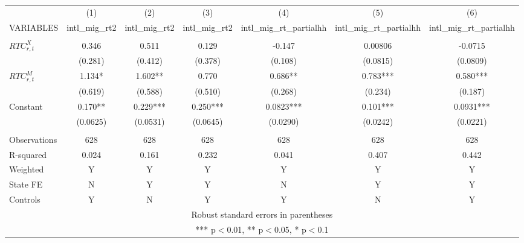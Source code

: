 \begin{tabular}{lcccccc} \hline
 & (1) & (2) & (3) & (4) & (5) & (6) \\
VARIABLES & intl\_mig\_rt2 & intl\_mig\_rt2 & intl\_mig\_rt2 & intl\_mig\_rt\_partialhh & intl\_mig\_rt\_partialhh & intl\_mig\_rt\_partialhh \\ \hline
 &  &  &  &  &  &  \\
$ RTC_{r,t}^X$ & 0.346 & 0.511 & 0.129 & -0.147 & 0.00806 & -0.0715 \\
 & (0.281) & (0.412) & (0.378) & (0.108) & (0.0815) & (0.0809) \\
$ RTC_{r,t}^M$ & 1.134* & 1.602** & 0.770 & 0.686** & 0.783*** & 0.580*** \\
 & (0.619) & (0.588) & (0.510) & (0.268) & (0.234) & (0.187) \\
Constant & 0.170** & 0.229*** & 0.250*** & 0.0823*** & 0.101*** & 0.0931*** \\
 & (0.0625) & (0.0531) & (0.0645) & (0.0290) & (0.0242) & (0.0221) \\
 &  &  &  &  &  &  \\
Observations & 628 & 628 & 628 & 628 & 628 & 628 \\
R-squared & 0.024 & 0.161 & 0.232 & 0.041 & 0.407 & 0.442 \\
Weighted & Y & Y & Y & Y & Y & Y \\
State FE & N & Y & Y & N & Y & Y \\
 Controls & Y & N & Y & Y & N & Y \\ \hline
\multicolumn{7}{c}{ Robust standard errors in parentheses} \\
\multicolumn{7}{c}{ *** p$<$0.01, ** p$<$0.05, * p$<$0.1} \\
\end{tabular}
